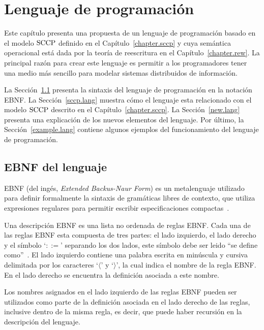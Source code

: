 
\chapter{Lenguaje de programaci\'on}
\label{chapter.lang}

Este cap\'itulo presenta una propuesta de un lenguaje de programaci\'on basado en el modelo $\textnormal{SCCP}$ definido en el Cap\'itulo~\ref{chapter.sccp} y cuya sem\'antica operacional est\'a dada por la teor\'ia de reescritura en el Cap\'itulo~\ref{chapter.rew}. La principal raz\'on para crear este lenguaje es permitir a los programadores tener una medio m\'as sencillo para modelar sistemas distribuidos de informaci\'on.  

La Secci\'on~\ref{ebnf.lang} presenta la sintaxis del lenguaje de programaci\'on en la notaci\'on EBNF. La Secci\'on~\ref{sccp.lang} muestra c\'omo el lenguaje esta relacionado con el modelo $\textnormal{SCCP}$ descrito en el Cap\'itulo~\ref{chapter.sccp}. La Secci\'on~\ref{new.lang} presenta una explicaci\'on de los nuevos elementos del lenguaje. Por \'ultimo, la Secci\'on~\ref{example.lang} contiene algunos ejemplos del funcionamiento del lenguaje de programaci\'on.

\section{EBNF del lenguaje}
\label{ebnf.lang}

EBNF (del ing\'es, \textit{Extended Backus-Naur Form}) es un metalenguaje utilizado para definir formalmente la sintaxis de gram\'aticas libres de contexto, que utiliza expresiones regulares para permitir escribir especificaciones compactas~\cite{ebnfdoc}. 

Una descripci\'on EBNF es una lista no ordenada de reglas EBNF. Cada una de las reglas EBNF esta compuesta de tres partes: el lado izquierdo, el lado derecho y el s\'imbolo `$::=$' separando los dos lados, este s\'imbolo debe ser leido ``se define como''~\cite{ebnfdoc}. El lado izquierdo contiene una palabra escrita en min\'uscula y cursiva delimitada por los caracteres `$\langle$' y `$\rangle$', la cual indica el nombre de la regla EBNF. En el lado derecho se encuentra la definici\'on asociada a este nombre. 

Los nombres asignados en el lado izquierdo de las reglas EBNF pueden ser utilizados como parte de la definici\'on asociada en el lado derecho de las reglas, inclusive dentro de la misma regla, es decir, que puede haber recursi\'on en la descripci\'on del lenguaje.

